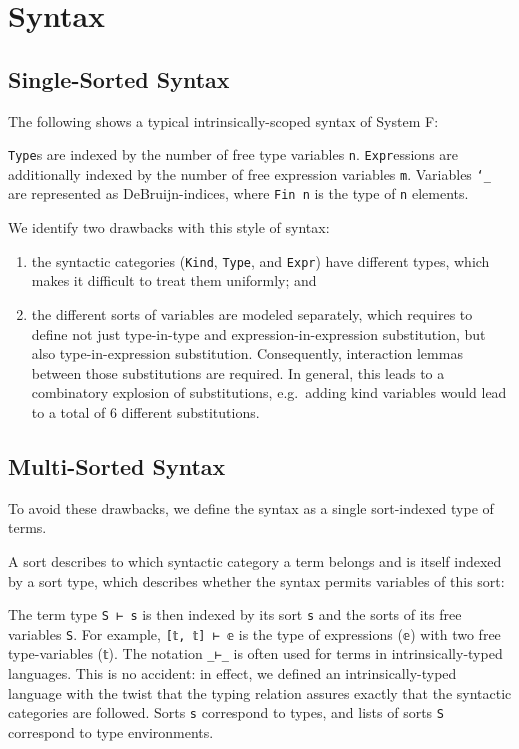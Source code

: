 \documentclass[sigplan,10pt]{acmart}
\newenvironment{LibCode*}{%
  \begin{tcolorbox}[%
    colframe=white,%
    boxrule=0.0pt,%
    top=2.5pt,%
    left=2.5pt,%
    bottom=2.5pt,%
    right=2.5pt,%
    boxsep=0pt%
  ]\vspace{-0.2\baselineskip}%
}{%
  \vspace{-1\baselineskip}%
  \end{tcolorbox}%
}
\newenvironment{ExampleCode*}{%
  \begin{tcolorbox}[%
    colframe=white,%
    colback=yellow!5,%
    boxrule=0.0pt,%
    top=2.5pt,%
    left=2.5pt,%
    bottom=2.5pt,%
    right=2.5pt,%
    boxsep=0pt%
  ]\vspace{-0.2\baselineskip}%
}{%
  \vspace{-1\baselineskip}%
  \end{tcolorbox}%
}
\newcommand*\LibCode[1]{\begin{LibCode*}{#1}\end{LibCode*}}
\newcommand*\AppCode[1]{{#1}}
\newcommand*\ExampleCode[1]{\begin{ExampleCode*}{#1}\end{ExampleCode*}}
\begin{document}
  \newpage

  \section{Syntax}
  \subsection{Single-Sorted Syntax}
  The following shows a typical intrinsically-scoped syntax of System F:
  \ExampleCode\FUnsortedSyntax

  \texttt{Type}s are indexed by the number of free type variables \texttt{n}.
  \texttt{Expr}essions are additionally indexed by the number of free expression variables \texttt{m}.
  Variables \texttt{`\_} are represented as DeBruijn-indices, where \texttt{Fin n} is the type of \texttt{n} elements.

  We identify two drawbacks with this style of syntax:
  \begin{enumerate}
  \item the syntactic categories (\texttt{Kind}, \texttt{Type}, and \texttt{Expr})
    have different types, which makes it difficult to treat them uniformly; and
  \item the different sorts of variables are modeled separately, which requires to define not just
    type-in-type and expression-in-expression substitution, but also type-in-expression substitution.
    Consequently, interaction lemmas between those substitutions are required.
    In general, this leads to a combinatory explosion of
    substitutions, e.g.\ adding kind variables would lead to a total of 6
    different substitutions.
  \end{enumerate}

  \subsection{Multi-Sorted Syntax}
  To avoid these drawbacks, we define the syntax as a single
  sort-indexed type of terms.

  A sort describes to which syntactic category a term belongs and is
  itself indexed by a sort type, which describes whether the syntax
  permits variables of this sort:
  \LibCode\KSortTy
  \AppCode\FSort
  
  The term type \texttt{S~⊢~s} is then indexed by its sort \texttt{s} and the sorts of its free variables \texttt{S}.
  For example, \texttt{[𝕥, 𝕥] ⊢ 𝕖} is the type of expressions (\texttt{𝕖}) with two free type-variables (\texttt{𝕥}).
  \newpage
  \AppCode\FSyntax
  The notation \texttt{\_⊢\_} is often used for terms in
  intrinsically-typed languages. This is no accident: in effect, we
  defined an intrinsically-typed language with the twist that the
  typing relation assures exactly that the syntactic categories are followed.
  Sorts \texttt{s} correspond to types, and lists of sorts \texttt{S}
  correspond to type environments.
\end{document}
